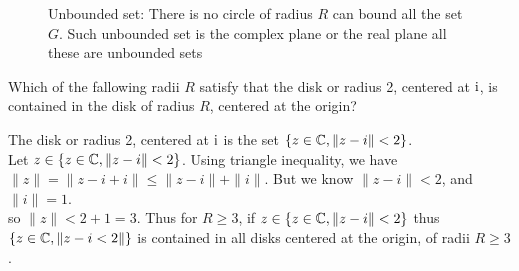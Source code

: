 \documentclass{caesar_book}
\begin{document}

\begin{figure}[ht]
    \centering
    \caption{Unbounded set: There is no circle of radius $R$ can bound all the set  $G$. Such unbounded set is the complex plane or the real plane all these are unbounded sets}
    \label{fig:unbounded_set}
\end{figure}
\begin{texample}
    Which of the fallowing radii $R$ satisfy that the disk or radius 2, centered at  $\rm{i}$, is contained in the disk of radius  $R$, centered at the origin?

    The disk or radius  2, centered at $\rm{i}$ is the set  $\{z \in {\mathbb{C}}, \|z-i\| < 2\} $.\\
    Let $z\in \{z\in {\mathbb{C}}, \|z-i\|< 2\} $. Using triangle inequality, we have $\|z\|=\|z-i+i\|\le \|z-i\|+ \|i\|$. But we know $\|z-i\|<2$, and $\|i\|=1$.\\
    so $\|z\| < 2 + 1 = 3$. Thus for $R\ge 3$, if $z \in \{z \in {\mathbb{C}}, \|z-i\|<2\}$ thus $\{z\in{\mathbb{C}},\|z-i<2\|\}$ is contained in all disks centered at the origin, of radii $R\ge 3$.
        
\end{texample}
\end{document}
